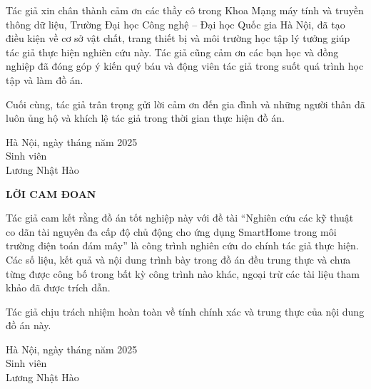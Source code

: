 \begin{titlepage}
    Tác giả xin chân thành cảm ơn các thầy cô trong Khoa Mạng máy tính và truyền thông dữ liệu, Trường Đại học Công nghệ – Đại học Quốc gia Hà Nội, đã tạo điều kiện về cơ sở vật chất, trang thiết bị và môi trường học tập lý tưởng giúp tác giả thực hiện nghiên cứu này. Tác giả cũng cảm ơn các bạn học và đồng nghiệp đã đóng góp ý kiến quý báu và động viên tác giả trong suốt quá trình học tập và làm đồ án.

    Cuối cùng, tác giả trân trọng gửi lời cảm ơn đến gia đình và những người thân đã luôn ủng hộ và khích lệ tác giả trong thời gian thực hiện đồ án.

    \begin{flushright}
        \begin{minipage}{0.6\linewidth}
            \begin{center}
                Hà Nội, ngày  tháng  năm 2025\\
                Sinh viên\\
                \vspace{2cm}
                Lương Nhật Hào
            \end{center}
        \end{minipage}
    \end{flushright}

    \newpage
    \begin{center}
        \textbf{\fontsize{12}{14.4}\selectfont\uppercase{{Lời cam đoan}}}
    \end{center}

    Tác giả cam kết rằng đồ án tốt nghiệp này với đề tài “Nghiên cứu các kỹ thuật co dãn tài nguyên đa cấp độ chủ động cho ứng dụng SmartHome trong môi trường điện toán đám mây” là công trình nghiên cứu do chính tác giả thực hiện. Các số liệu, kết quả và nội dung trình bày trong đồ án đều trung thực và chưa từng được công bố trong bất kỳ công trình nào khác, ngoại trừ các tài liệu tham khảo đã được trích dẫn.

    Tác giả chịu trách nhiệm hoàn toàn về tính chính xác và trung thực của nội dung đồ án này.

    \begin{flushright}
        \begin{minipage}{0.6\linewidth}
            \begin{center}
                Hà Nội, ngày  tháng  năm 2025\\
                Sinh viên\\
                \vspace{2cm}
                Lương Nhật Hào
            \end{center}
        \end{minipage}
    \end{flushright}
    \newpage

\end{titlepage}